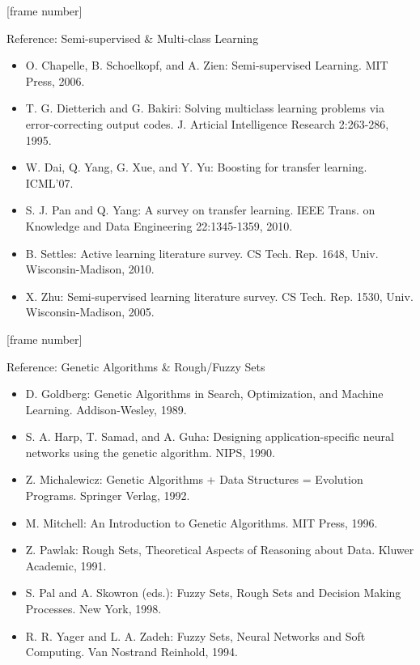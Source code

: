 \documentclass[aspectratio=169,t,table]{beamer}
\begin{document}
  {
    [frame number]
    \begin{frame}{Reference: Semi-supervised \& Multi-class Learning}
      \begin{itemize}
        \item O. Chapelle, B. Schoelkopf, and A. Zien: Semi-supervised Learning. MIT Press, 2006.
        \item T. G. Dietterich and G. Bakiri: Solving multiclass learning problems via error-correcting output codes. J. Articial Intelligence Research 2:263-286, 1995.
        \item W. Dai, Q. Yang, G. Xue, and Y. Yu: Boosting for transfer learning. ICML'07.
        \item S. J. Pan and Q. Yang: A survey on transfer learning. IEEE Trans. on Knowledge and Data Engineering 22:1345-1359, 2010.
        \item B. Settles: Active learning literature survey. CS Tech. Rep. 1648, Univ. Wisconsin-Madison, 2010.
        \item X. Zhu: Semi-supervised learning literature survey. CS Tech. Rep. 1530, Univ. Wisconsin-Madison, 2005.
      \end{itemize}
    \end{frame}
  }

  {
    [frame number]
    \begin{frame}{Reference: Genetic Algorithms \& Rough/Fuzzy Sets}
      \begin{itemize}
        \item D. Goldberg: Genetic Algorithms in Search, Optimization, and Machine Learning. Addison-Wesley, 1989.
        \item S. A. Harp, T. Samad, and A. Guha: Designing application-specific neural networks using the genetic algorithm. NIPS, 1990.
        \item Z. Michalewicz: Genetic Algorithms + Data Structures = Evolution Programs. Springer Verlag, 1992.
        \item M. Mitchell: An Introduction to Genetic Algorithms. MIT Press, 1996.
        \item Z. Pawlak: Rough Sets, Theoretical Aspects of Reasoning about Data. Kluwer Academic, 1991.
        \item S. Pal and A. Skowron (eds.): Fuzzy Sets, Rough Sets and Decision Making Processes. New York, 1998.
        \item R. R. Yager and L. A. Zadeh: Fuzzy Sets, Neural Networks and Soft Computing. Van Nostrand Reinhold, 1994.
      \end{itemize}
    \end{frame}
  }
\end{document}
